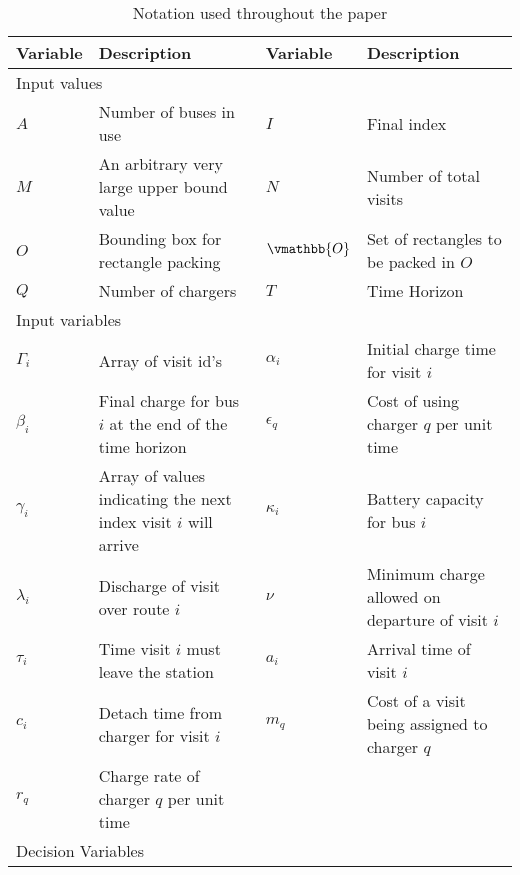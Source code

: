 \documentclass[letterpaper, 10pt, conference]{IEEEtran}
\begin{document}
\begin{table*}[!t]
	\caption{Notation used throughout the paper}
	\label{tab:variables}
	\centering
	\begin{tabular}{l l l l}
		\toprule
		\textbf{Variable} & \textbf{Description} & \textbf{Variable} & \textbf{Description} \\
		\toprule
		\multicolumn{4}{l}{Input values} \\
			$A$           & Number of buses in use &
			$I$           & Final index                               \\
			$M$           & An arbitrary very large upper bound value &
			$N$           & Number of total visits                    \\
			$O$           & Bounding box for rectangle packing        &
			$\vmathbb{O}$ & Set of rectangles to be packed in \(O\)   \\
			$Q$           & Number of chargers                        &
			$T$           & Time Horizon                              \\
		\hline
		\multicolumn{4}{l}{Input variables} \\
			$\Gamma_i$   & Array of visit id's                                             &
			$\alpha_i$   & Initial charge time for visit  $i$                              \\
			$\beta_{i}$  & Final charge for bus $i$ at the end of the time horizon         &
			$\epsilon_q$ & Cost of using charger $q$ per unit time                         \\
			$\gamma_i$   & Array of values indicating the next index visit $i$ will arrive &
			$\kappa_i$   & Battery capacity for bus \(i\)                                  \\
			$\lambda_i$  & Discharge of visit over route  $i$                              &
			$\nu$        & Minimum charge allowed on departure of visit \(i\)              \\
			$\tau_i$     & Time visit $i$ must leave the station                           &
			$a_i$        & Arrival time of visit  $i$                                      \\
			$c_i$        & Detach time from charger for visit \(i\)                        &
			$m_q$        & Cost of a visit being assigned to charger  $q$                  \\
			$r_q$        & Charge rate of charger $q$ per unit time                        \\
		\hline
		\multicolumn{4}{l}{Decision Variables} \\

\end{tabular}
\end{table*}
\end{document}
